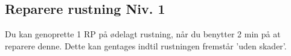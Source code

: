 \subsection{Reparere rustning Niv. 1}
Du kan genoprette 1 RP på ødelagt rustning, når du benytter 2 min på at reparere denne. Dette kan gentages indtil rustningen fremstår 'uden skader'.\\